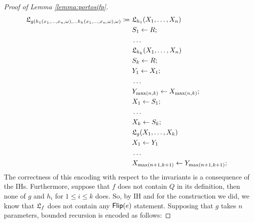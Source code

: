\begin{proof}[Proof of Lemma \ref{lemma:portosifp}]
\begin{align*}
{\mathfrak L_{g(h_1(x_1,\ldots, x_n, \omega), \ldots h_k(x_1,\ldots, x_n, \omega), \omega)}}\coloneqq\ &
{\mathfrak L_{h_1}}(X_1, \ldots, X_n)\\
&S_1 \leftarrow R;\\
&\ldots\\
&{\mathfrak L_{h_k}}(X_1, \ldots, X_n)\\
&S_k \leftarrow R;\\
&Y_1 \leftarrow X_1;\\
& \ldots\\
& Y_{\max(n, k)} \leftarrow X_{\max(n, k)};\\
& X_1 \leftarrow S_1;\\
& \ldots\\
& X_k \leftarrow S_k;\\
&{\mathfrak L_{g}}(X_1, \ldots, X_k)\\
& X_1 \leftarrow Y_1\\
&\ldots\\
&X_{\max(n+1, k+1)} \leftarrow Y_{\max(n+1, k+1)};\\
\end{align*}
\normalsize
%
The correctness of this encoding with respect to the
invariants is a consequence of the IHs. Furthermore, suppose that
$f$ does not contain $Q$ in its definition, then none of $g$ and $h_i$
for $1 \le i \le k$ does. So, by IH and for the construction we did,
we know that ${\mathfrak L_{f}}$ does not contain any $\mathsf{Flip(}e\mathsf{)}$ statement.
%
Supposing that $g$ takes $n$ parameters,
 bounded recursion is encoded as follows:
%


\end{proof}
